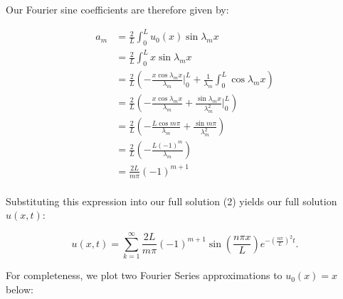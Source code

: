 \begin{solution}
    Our Fourier sine coefficients are therefore given by:

    \begin{align*}
        a_m &= \frac{2}{L} \int_{0}^{L}{u_0(x) \sin{\lambda_m x}} \\
            &= \frac{2}{L} \int_{0}^{L}{x \sin{\lambda_m x}} \\
            &= \frac{2}{L} \left( -\frac{x \cos{\lambda_m x}}{\lambda_m} \bigg\rvert_{0}^{L} + \frac{1}{\lambda_m} \int_{0}^{L}{\cos{\lambda_m x}} \right) \\
            &= \frac{2}{L} \left( -\frac{x \cos{\lambda_m x}}{\lambda_m} + \frac{\sin{\lambda_m x}}{\lambda_m^2} \bigg\rvert_{0}^{L} \right) \\
            &= \frac{2}{L} \left( -\frac{L \cos{m \pi}}{\lambda_m} + \frac{\sin{m \pi}}{\lambda_m^2} \right) \\
            &= \frac{2}{L} \left( -\frac{L (-1)^m}{\lambda_m} \right) \\
            &= \frac{2 L}{m \pi} (-1)^{m+1} \\
    \end{align*}

    Substituting this expression into our full solution (2) yields our full solution $u(x, t)$:
    
    $$
    u(x, t) = \sum\limits_{k=1}^{\infty}{\frac{2 L}{m \pi} (-1)^{m+1} \sin\left(\frac{n \pi x}{L}\right)} e^{-\left(\frac{n \pi}{L}\right)^2 t}.
    $$

    For completeness, we plot two Fourier Series approximations to $u_0(x) = x$ below: \\


\end{solution}
